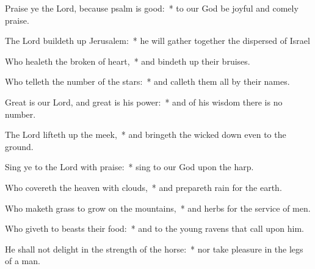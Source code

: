 \begin{enpars}
\item Praise ye the Lord, because psalm is good:~* to our God be joyful and comely praise.
\item The Lord buildeth up Jerusalem:~* he will gather together the dispersed of Israel
\item Who healeth the broken of heart,~* and bindeth up their bruises.
\item Who telleth the number of the stars:~* and calleth them all by their names.
\item Great is our Lord, and great is his power:~* and of his wisdom there is no number.
\item The Lord lifteth up the meek,~* and bringeth the wicked down even to the ground.
\item Sing ye to the Lord with praise:~* sing to our God upon the harp.
\item Who covereth the heaven with clouds,~* and prepareth rain for the earth.
\item Who maketh grass to grow on the mountains,~* and herbs for the service of men.
\item Who giveth to beasts their food:~* and to the young ravens that call upon him.
\item He shall not delight in the strength of the horse:~* nor take pleasure in the legs of a man.
\end{enpars}